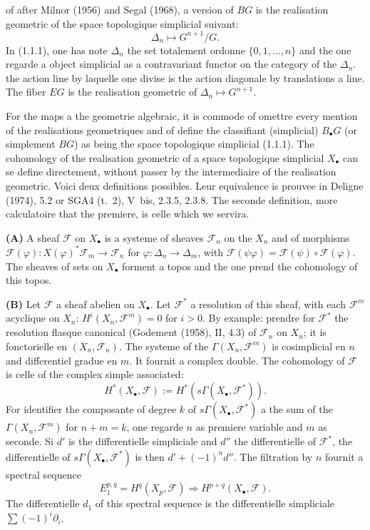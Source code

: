 \documentclass[11pt,a4paper]{article}
\theoremstyle{plain}
\theoremstyle{definition}
\begin{document}
of after Milnor (1956) and Segal (1968), a version of $BG$ is the realisation geometric of the space topologique simplicial suivant:
\begin{equation}\label{1.1.1}
\Delta_n \mapsto G^{n+1}/G.
\end{equation}
In (1.1.1), one has note $\Delta_n$ the set totalement ordonne $\{0, 1, \ldots, n\}$ and the one regarde a object simplicial as a contravariant functor on the category of the $\Delta_n$. the action line by laquelle one divise is the action diagonale by translations a line. The fiber $EG$ is the realisation geometric of $\Delta_n \mapsto G^{n+1}$.

For the maps a the geometrie algebraic, it is commode of omettre every mention of the realisations geometriques and of define the classifiant (simplicial) $B_\bullet G$ (or simplement $BG$) as being the space topologique simplicial (1.1.1). The cohomology of the realisation geometric of a space topologique simplicial $X_\bullet$ can se define directement, without passer by the intermediaire of the realisation geometric. Voici deux definitions possibles. Leur equivalence is prouvee in Deligne (1974), 5.2 or SGA4 (t.~2), V~bis, 2.3.5, 2.3.8. The seconde definition, more calculatoire that the premiere, is celle which we servira.

\textbf{(A)} A sheaf $\mathscr{F}$ on $X_\bullet$ is a systeme of sheaves $\mathscr{F}_n$ on the $X_n$ and of morphisms $\mathscr{F}(\varphi) : X(\varphi)^* \mathscr{F}_m \to \mathscr{F}_n$ for $\varphi : \Delta_n \to \Delta_m$, with $\mathscr{F}(\psi\varphi) = \mathscr{F}(\psi) \circ \mathscr{F}(\varphi)$. The sheaves of sets on $X_\bullet$ forment a topos and the one prend the cohomology of this topos.

\textbf{(B)} Let $\mathscr{F}$ a sheaf abelien on $X_\bullet$. Let $\mathscr{F}^*$ a resolution of this sheaf, with each $\mathscr{F}^m$ acyclique on $X_n$: $H^i(X_n, \mathscr{F}^m) = 0$ for $i > 0$. By example: prendre for $\mathscr{F}^*$ the resolution flasque canonical (Godement (1958), II, 4.3) of $\mathscr{F}_n$ on $X_n$; it is fonctorielle en $(X_n, \mathscr{F}_n)$. The systeme of the $\Gamma(X_n, \mathscr{F}^m)$ is cosimplicial en $n$ and differentiel gradue en $m$. It fournit a complex double. The cohomology of $\mathscr{F}$ is celle of the complex simple associated:
\begin{equation}\label{1.1.2}
H^*(X_\bullet, \mathscr{F}) := H^*(s\Gamma(X_\bullet, \mathscr{F}^*)).
\end{equation}
For identifier the composante of degree $k$ of $s\Gamma(X_\bullet, \mathscr{F}^*)$ a the sum of the $\Gamma(X_n, \mathscr{F}^m)$ for $n + m = k$, one regarde $n$ as premiere variable and $m$ as seconde. Si $d'$ is the differentielle simpliciale and $d''$ the differentielle of $\mathscr{F}^*$, the differentielle of $s\Gamma(X_\bullet, \mathscr{F}^*)$ is then $d' + (-1)^n d''$. The filtration by $n$ fournit a spectral sequence
\begin{equation}\label{1.1.3}
E_1^{p,q} = H^q(X_p, \mathscr{F}) \Rightarrow H^{p+q}(X_\bullet, \mathscr{F}).
\end{equation}
The differentielle $d_1$ of this spectral sequence is the differentielle simpliciale $\sum (-1)^i \partial_i$.
\end{document}
